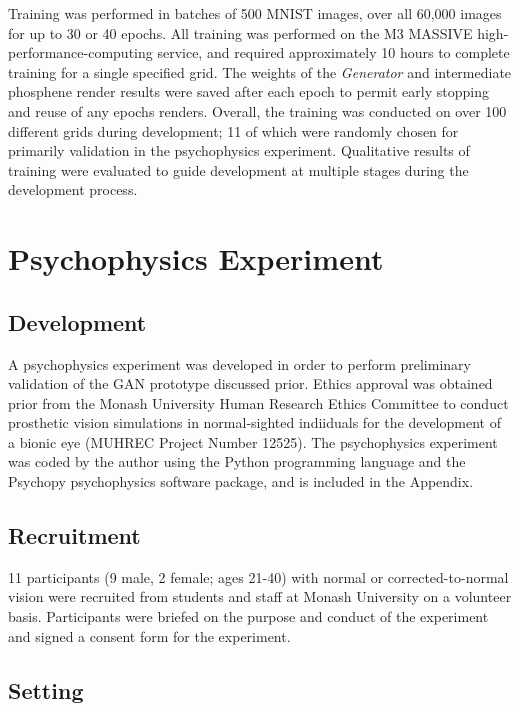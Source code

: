 \documentclass[a4paper,11pt,openany]{book}
\begin{document}
Training was performed in batches of 500 MNIST images, over all 60,000 images for up to 30 or 40 epochs.
All training was performed on the M3 MASSIVE high-performance-computing service, and required approximately 10 hours to complete training for a single specified grid.
The weights of the \emph{Generator} and intermediate phosphene render results were saved after each epoch to permit early stopping and reuse of any epochs renders.
Overall, the training was conducted on over 100 different grids during development; 11 of which were randomly chosen for primarily validation in the psychophysics experiment.
Qualitative results of training were evaluated to guide development at multiple stages during the development process.

\chapter{Psychophysics Experiment}
\label{sec:org15bbe07}
\section*{Development}
\label{sec:orga9566f1}

A psychophysics experiment was developed in order to perform preliminary validation of the GAN prototype discussed prior.
Ethics approval was obtained prior from the Monash University Human Research Ethics Committee to conduct prosthetic vision simulations in normal-sighted indiiduals for the development of a bionic eye (MUHREC Project Number 12525).
The psychophysics experiment was coded by the author using the Python programming language and the Psychopy psychophysics software package, and is included in the Appendix.

\section*{Recruitment}
\label{sec:org3f32e8f}

11 participants (9 male, 2 female; ages 21-40) with normal or corrected-to-normal vision were recruited from students and staff at Monash University on a volunteer basis.
Participants were briefed on the purpose and conduct of the experiment and signed a consent form for the experiment.

\section*{Setting}
\label{sec:org8861e17}
\end{document}
